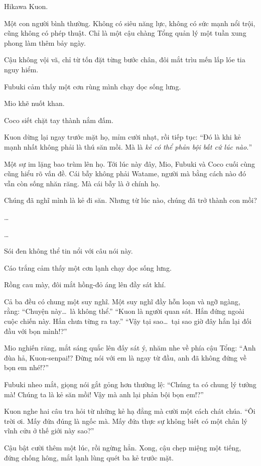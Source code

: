 \documentclass[../main.tex]{subfiles}
\begin{document}
Hikawa Kuon.

Một con người bình thường. Không có siêu năng lực, không có sức mạnh nổi trội, cũng không có phép thuật. Chỉ là một cậu chàng Tổng quản lý một tuần xung phong làm thêm bảy ngày.

Cậu không vội vã, chỉ từ tốn đặt từng bước chân, đôi mắt trìu mến lấp lóe tia nguy hiểm.

Fubuki cảm thấy một cơn rùng mình chạy dọc sống lưng.

Mio khẽ nuốt khan.

Coco siết chặt tay thành nắm đấm.

Kuon dừng lại ngay trước mặt họ, mỉm cười nhạt, rồi tiếp tục: ``Đó là khi kẻ mạnh nhất không phải là thú săn mồi. Mà là \emph{kẻ có thể phản bội bất cứ lúc nào.}''

Một sự im lặng bao trùm lên họ. Tới lúc này đây, Mio, Fubuki và Coco cuối cùng cũng hiểu rõ vấn đề. Cái bẫy không phải Watame, người mà bằng cách nào đó vẫn còn sống nhăn răng. Mà cái bẫy là ở chính họ.

Chúng đã nghĩ mình là kẻ đi săn. Nhưng từ lúc nào, chúng đã trở thành con mồi?

\dots

\dots

Sói đen không thể tin nổi với câu nói này.

Cáo trắng cảm thấy một cơn lạnh chạy dọc sống lưng.

Rồng cau mày, đôi mắt hồng-đỏ áng lên đầy sát khí.

Cả ba đều có chung một suy nghĩ. Một suy nghĩ đầy hỗn loạn và ngỡ ngàng, rằng: ``Chuyện này\dots\ là không thể.'' ``Kuon là người quan sát. Hắn đứng ngoài cuộc chiến này. Hắn chưa từng ra tay.'' ``Vậy tại sao\dots\ tại sao giờ đây hắn lại đối đầu với bọn mình!?''

Mio nghiến răng, mắt sáng quắc lên đấy sát ý, nhăm nhe về phía cậu Tổng: ``Anh đùa hả, Kuon-senpai!? Đừng nói với em là ngay từ đầu, anh đã không đứng về bọn em nhé!?''

Fubuki nheo mắt, giọng nói gắt gỏng hơn thường lệ: ``Chúng ta có chung lý tưởng mà! Chúng ta là kẻ săn mồi! Vậy mà anh lại phản bội bọn em!?''

Kuon nghe hai câu tra hỏi từ những kẻ hạ đẳng mà cười một cách chát chúa. ``Ôi trời ơi. Mấy đứa đúng là ngốc mà. Mấy đứa thực sự không biết có một chân lý vĩnh cửu ở thế giới này sao?''

Cậu bật cười thêm một lúc, rồi ngừng hẳn. Xong, cậu chẹp miệng một tiếng, đứng chống hông, mắt lạnh lùng quét ba kẻ trước mặt.
\end{document}
